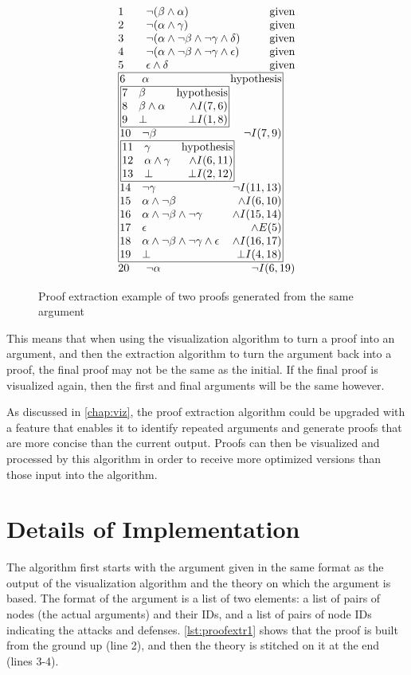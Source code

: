 \documentclass[11pt,twoside,a4paper]{report}
\begin{document}
\begin{figure}[thp]
\begin{minipage}[c]{.35\linewidth}
\[\vbox{\offinterlineskip\halign{
&\tabskip=1.5em#\strut&$#$\hfil\tabskip=1em&\hfil$#$\tabskip=0em\cr
%
1&\neg(\beta\wedge\alpha)&\mbox{given}\cr
2&\neg(\alpha\wedge\gamma)&\mbox{given}\cr
3&\neg(\alpha\wedge\neg\beta\wedge\neg\gamma\wedge\delta)&\mbox{given}\cr
4&\neg(\alpha\wedge\neg\beta\wedge\neg\gamma\wedge\epsilon)&\mbox{given}\cr
5&\epsilon\wedge\delta&\mbox{given}\cr
%
\multispan3\vbox{\halign{
\vrule#&&\hskip.1em\tabskip=1em#\strut&$#$\hfil\tabskip=1em&\hfil$#$\hskip0.1em\tabskip=0em&\vrule#\cr
\noalign{\hrule}
%
&6&\alpha&\mbox{hypothesis}&\cr
%
&\multispan3\,\vbox{\halign{
\vrule#&&\hskip.1em\tabskip=1em#\strut&$#$\hfil\tabskip=1em&\hfil$#$\hskip0.1em\tabskip=0em&\vrule#\cr
\noalign{\hrule}
%
&7&\beta&\mbox{hypothesis}&\cr
&8&\beta\wedge\alpha&\wedge I(7,6)&\cr
&9&\bot&\bot I(1,8)&\cr
%
\noalign{\hrule}}}\,&\cr
%
&10&\neg\beta&\neg I(7,9)&\cr
%
&\multispan3\,\vbox{\halign{
\vrule#&&\hskip.1em\tabskip=1em#\strut&$#$\hfil\tabskip=1em&\hfil$#$\hskip0.1em\tabskip=0em&\vrule#\cr
\noalign{\hrule}
%
&11&\gamma&\mbox{hypothesis}&\cr
&12&\alpha\wedge\gamma&\wedge I(6,11)&\cr
&13&\bot&\bot I(2,12)&\cr
%
\noalign{\hrule}}}\,&\cr
%
&14&\neg\gamma&\neg I(11,13)&\cr
&15&\alpha\wedge\neg\beta&\wedge I(6,10)&\cr
&16&\alpha\wedge\neg\beta\wedge\neg\gamma&\wedge I(15,14)&\cr
&17&\epsilon&\wedge E(5)&\cr
&18&\alpha\wedge\neg\beta\wedge\neg\gamma\wedge\epsilon&\wedge I(16,17)&\cr
&19&\bot&\bot I(4,18)&\cr
%
\noalign{\hrule}}}\,\cr
%
20&\neg\alpha&\neg I(6,19)\cr
}}\]
\end{minipage}%
\caption{Proof extraction example of two proofs generated from the same argument\label{fig:extrex2}}
\end{figure}

This means that when using the visualization algorithm to turn a proof into an argument, and then the extraction algorithm to turn the argument back into a proof, the final proof may not be the same as the initial. If the final proof is visualized again, then the first and final arguments will be the same however.

As discussed in \autoref{chap:viz}, the proof extraction algorithm could be upgraded with a feature that enables it to identify repeated arguments and generate proofs that are more concise than the current output. Proofs can then be visualized and processed by this algorithm in order to receive more optimized versions than those input into the algorithm.

\section{Details of Implementation}
The algorithm first starts with the argument given in the same format as the output of the visualization algorithm and the theory on which the argument is based. The format of the argument is a list of two elements: a list of pairs of nodes (the actual arguments) and their IDs, and a list of pairs of node IDs indicating the attacks and defenses. \autoref{lst:proofextr1} shows that the proof is built from the ground up (line 2), and then the theory is stitched on it at the end (lines 3-4).
\end{document}
